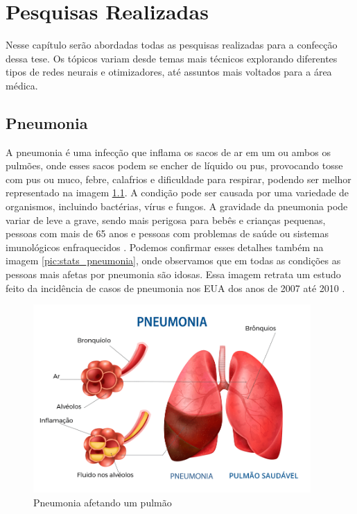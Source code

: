 
\chapter{Pesquisas Realizadas}
\label{cha:Pesquisas Realizadas}


Nesse capítulo serão abordadas todas as pesquisas realizadas para a confecção dessa tese. Os tópicos variam desde temas mais técnicos explorando diferentes tipos de redes neurais e otimizadores, até assuntos mais voltados para a área médica.




\section{Pneumonia}


A pneumonia é uma infecção que inflama os sacos de ar em um ou ambos os pulmões, onde esses sacos podem se encher de líquido ou pus, provocando tosse com pus ou muco, febre, calafrios e dificuldade para respirar, podendo ser melhor representado na imagem \ref{pic:pneumonia}. A condição pode ser causada por uma variedade de organismos, incluindo bactérias, vírus e fungos. A gravidade da pneumonia pode variar de leve a grave, sendo mais perigosa para bebês e crianças pequenas, pessoas com mais de 65 anos e pessoas com problemas de saúde ou sistemas imunológicos enfraquecidos \cite{WHO2023Pneumonia}. Podemos confirmar esses detalhes também na imagem \ref{pic:stats_pneumonia}, onde observamos que em todas as condições as pessoas mais afetas por pneumonia são idosas. Essa imagem retrata um estudo feito da incidência de casos de pneumonia nos EUA dos anos de 2007 até 2010 \cite{doi:10.2147/COPD.S140378}.

\begin{figure}[!ht]
    \begin{center}
    \includegraphics[width=300pt]{pictures/pneumonia -2.png}
    \caption{Pneumonia afetando um pulmão}
    \label{pic:pneumonia}
    \end{center}
\end{figure}

